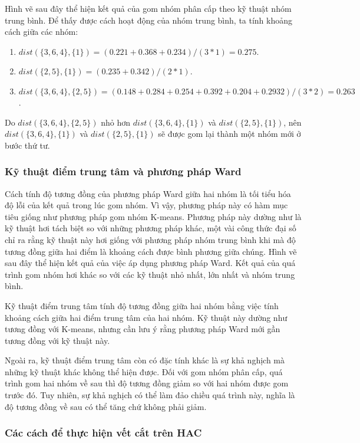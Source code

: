 Hình vẽ sau đây thể hiện kết quả của gom nhóm phân cấp theo kỹ thuật nhóm trung bình.
Để thấy được cách hoạt động của nhóm trung bình, ta tính khoảng cách giữa các nhóm:
\begin{enumerate}
\item[]$dist(\{3, 6, 4\}, \{1\}) = (0.221 + 0.368 + 0.234) / (3 * 1) = 0.275$. 
\item[]$dist(\{2, 5\}, \{1\}) = (0.235 + 0.342) / (2 * 1)$.
\item[]$dist(\{3, 6, 4\}, \{2, 5\}) = (0.148 + 0.284 + 0.254 + 0.392 + 0.204 + 0.2932) /  (3 * 2) = 0.263$.
\end{enumerate}

Do $dist(\{3, 6, 4\}, \{2, 5\})$ nhỏ hơn $dist(\{3, 6, 4\}, \{1\})$ và $dist(\{2, 5\}, \{1\})$, nên $dist(\{3, 6, 4\}, \{1\})$ và $dist(\{2, 5\}, \{1\})$ sẽ được gom lại thành một nhóm mới ở bước thứ tư.

\subsubsection{Kỹ thuật điểm trung tâm và phương pháp Ward}
Cách tính độ tương đồng của phương pháp Ward giữa hai nhóm là tối tiểu hóa độ lỗi của kết quả trong lúc gom nhóm.
Vì vậy, phương pháp này có hàm mục tiêu giống như phương pháp gom nhóm K-means.
Phương pháp này dường như là kỹ thuật hơi tách biệt so với những phương pháp khác, một vài công thức đại số chỉ ra rằng kỹ thuật này hơi giống với phương pháp nhóm trung bình khi mà độ tương đồng giữa hai điểm là khoảng cách được bình phương giữa chúng.
Hình vẽ sau đây thể hiện kết quả của việc áp dụng phương pháp Ward. Kết quả của quá trình gom nhóm hơi khác so với các kỹ thuật nhỏ nhất, lớn nhất và nhóm trung bình.

Kỹ thuật điểm trung tâm tính độ tương đồng giữa hai nhóm bằng việc tính khoảng cách giữa hai điểm trung tâm của hai nhóm.
Kỹ thuật này dường như tương đồng với K-means, nhưng cần lưu ý rằng phương pháp Ward mới gần tương đồng với kỹ thuật này.

Ngoài ra, kỹ thuật điểm trung tâm còn có đặc tính khác là sự khả nghịch mà những kỹ thuật khác không thể hiện được.
Đối với gom nhóm phân cấp, quá trình gom hai nhóm về sau thì độ tương đồng giảm so với hai nhóm được gom trước đó.
Tuy nhiên, sự khả nghịch có thể làm đảo chiều quá trình này, nghĩa là độ tương đồng về sau có thể tăng chứ không phải giảm.


\subsubsection{Các cách để thực hiện vết cắt trên HAC}

